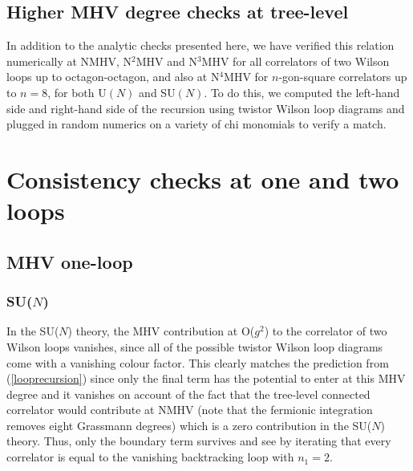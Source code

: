 \documentclass[12pt]{article}
\numberwithin{equation}{section}
\begin{document}
\subsection{Higher MHV degree checks at tree-level}

In addition to the analytic checks presented here, we have verified this relation numerically at NMHV, N$^2$MHV and N$^3$MHV for all correlators of two Wilson loops up to octagon-octagon, and also at N$^4$MHV for $n$-gon-square correlators up to $n=8$, for both U$(N)$ and SU$(N)$. To do this, we computed the left-hand side and right-hand side of the recursion using twistor Wilson loop diagrams and plugged in random numerics on a variety of chi monomials to verify a match.

\section{Consistency checks at one and two loops}

\subsection{MHV one-loop}

\subsubsection{SU(\texorpdfstring{$N$}{N})}
In the SU($N$) theory, the MHV contribution at O($g^2$) to the correlator of two Wilson loops vanishes, since all of the possible twistor Wilson loop diagrams come with a vanishing colour factor. This clearly matches the prediction from (\ref{looprecursion}) since only the final term has the potential to enter at this MHV degree and it vanishes on account of the fact that the tree-level connected correlator would contribute at NMHV (note that the fermionic integration removes eight Grassmann degrees) which is a zero contribution in the SU($N$) theory. Thus, only the boundary term survives and see by iterating that every correlator is equal to the vanishing backtracking loop with \(n_1=2\).
\end{document}
